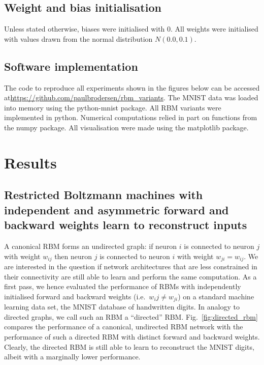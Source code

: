 \documentclass[11pt]{article}
\begin{document}

\subsection{Weight and bias initialisation}

Unless stated otherwise, biases were initialised with 0. All weights
were initialised with values drawn from the normal distribution
$N(0.0, 0.1)$.


\subsection{Software implementation}

The code to reproduce all experiments shown in the figures below can
be accessed at\url{https://github.com/paulbrodersen/rbm_variants}.
The MNIST data was loaded into memory using the python-mnist
package. All RBM variants were implemented in python. Numerical
computations relied in part on functions from the numpy package. All
visualisation were made using the matplotlib package.

\section{Results}

\subsection{Restricted Boltzmann machines with independent and asymmetric forward and backward weights learn to reconstruct inputs}

A canonical RBM forms an undirected graph: if neuron $i$ is connected
to neuron $j$ with weight $w_{ij}$ then neuron $j$ is connected to
neuron $i$ with weight $w_{ji} = w_{ij}$. We are interested in the
question if network architectures that are less constrained in their
connectivity are still able to learn and perform the same
computation. As a first pass, we hence evaluated the performance of
RBMs with independently initialised forward and backward weights
(i.e.\ $w_ij \neq w_{ji}$) on a standard machine learning data set, the
MNIST database of handwritten digits. In analogy to directed graphs,
we call such an RBM a ``directed'' RBM. Fig.~\ref{fig:directed_rbm}
compares the performance of a canonical, undirected RBM network with
the performance of such a directed RBM with distinct forward and
backward weights. Clearly, the directed RBM is still able to learn to
reconstruct the MNIST digits, albeit with a marginally lower
performance.
\end{document}
